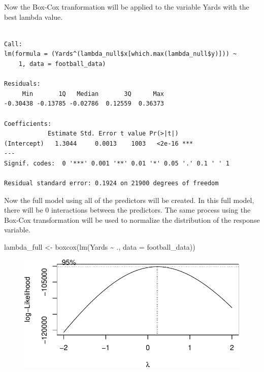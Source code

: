 \documentclass[
  super,
  preprint,
  3p]{elsarticle}
\newenvironment{Shaded}{\begin{snugshade}}{\end{snugshade}}
\newcommand{\AttributeTok}[1]{\textcolor[rgb]{0.40,0.45,0.13}{#1}}
\newcommand{\DecValTok}[1]{\textcolor[rgb]{0.68,0.00,0.00}{#1}}
\newcommand{\FunctionTok}[1]{\textcolor[rgb]{0.28,0.35,0.67}{#1}}
\newcommand{\NormalTok}[1]{\textcolor[rgb]{0.00,0.23,0.31}{#1}}
\newcommand{\OtherTok}[1]{\textcolor[rgb]{0.00,0.23,0.31}{#1}}
\newcommand{\SpecialCharTok}[1]{\textcolor[rgb]{0.37,0.37,0.37}{#1}}
\begin{document}
Now the Box-Cox tranformation will be applied to the variable Yards with
the best lambda value.

\begin{Shaded}
\end{Shaded}

\begin{verbatim}

Call:
lm(formula = (Yards^(lambda_null$x[which.max(lambda_null$y)])) ~ 
    1, data = football_data)

Residuals:
     Min       1Q   Median       3Q      Max 
-0.30438 -0.13785 -0.02786  0.12559  0.36373 

Coefficients:
            Estimate Std. Error t value Pr(>|t|)    
(Intercept)   1.3044     0.0013    1003   <2e-16 ***
---
Signif. codes:  0 '***' 0.001 '**' 0.01 '*' 0.05 '.' 0.1 ' ' 1

Residual standard error: 0.1924 on 21900 degrees of freedom
\end{verbatim}

Now the full model using all of the predictors will be created. In this
full model, there will be 0 interactions between the predictors. The
same process using the Box-Cox transformation will be used to normalize
the distribution of the response variable.

\begin{Shaded}
\begin{Highlighting}[]
\NormalTok{lambda\_full }\OtherTok{\textless{}{-}} \FunctionTok{boxcox}\NormalTok{(}\FunctionTok{lm}\NormalTok{(Yards }\SpecialCharTok{\textasciitilde{}}\NormalTok{ ., }\AttributeTok{data =}\NormalTok{ football\_data))}
\end{Highlighting}
\end{Shaded}

\begin{figure}[H]

{\centering \includegraphics{project_report_files/figure-pdf/unnamed-chunk-23-1.pdf}

}

\end{figure}
\end{document}
